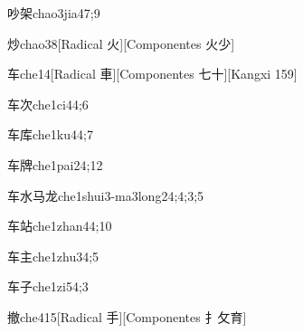 \begin{verbete}{吵架}{chao3jia4}{7;9}
\end{verbete}

\begin{verbete}{炒}{chao3}{8}[Radical ⽕][Componentes ⽕少]
\end{verbete}

\begin{verbete}{车}{che1}{4}[Radical 車][Componentes 七十][Kangxi 159]
\end{verbete}

\begin{verbete}{车次}{che1ci4}{4;6}
\end{verbete}

\begin{verbete}{车库}{che1ku4}{4;7}
\end{verbete}

\begin{verbete}{车牌}{che1pai2}{4;12}
\end{verbete}

\begin{verbete}{车水马龙}{che1shui3-ma3long2}{4;4;3;5}
\end{verbete}

\begin{verbete}{车站}{che1zhan4}{4;10}
\end{verbete}

\begin{verbete}{车主}{che1zhu3}{4;5}
\end{verbete}

\begin{verbete}{车子}{che1zi5}{4;3}
\end{verbete}

\begin{verbete}{撤}{che4}{15}[Radical 手][Componentes ⺘攵育]
\end{verbete}

